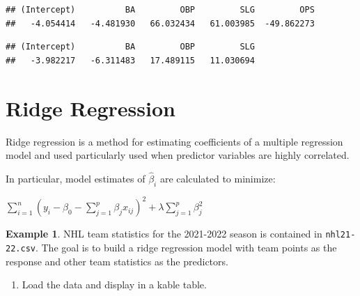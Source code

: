 \documentclass[
  11pt,
]{book}
\newenvironment{Shaded}{\begin{snugshade}}{\end{snugshade}}
\newcommand{\CommentTok}[1]{\textcolor[rgb]{0.56,0.35,0.01}{\textit{#1}}}
\newcommand{\FunctionTok}[1]{\textcolor[rgb]{0.00,0.00,0.00}{#1}}
\newcommand{\NormalTok}[1]{#1}
\newcommand{\SpecialCharTok}[1]{\textcolor[rgb]{0.00,0.00,0.00}{#1}}
\providecommand{\tightlist}{%
  \setlength{\itemsep}{0pt}\setlength{\parskip}{0pt}}
\theoremstyle{definition}
\theoremstyle{definition}
\newtheorem{example}{Example}[chapter]
\theoremstyle{definition}
\theoremstyle{definition}
\theoremstyle{remark}
\begin{document}
\begin{verbatim}
## (Intercept)          BA         OBP         SLG         OPS 
##   -4.054414   -4.481930   66.032434   61.003985  -49.862273
\end{verbatim}

\begin{Shaded}
\end{Shaded}

\begin{verbatim}
## (Intercept)          BA         OBP         SLG 
##   -3.982217   -6.311483   17.489115   11.030694
\end{verbatim}

\newpage

\hypertarget{ridge-regression}{%
\section{Ridge Regression}\label{ridge-regression}}

Ridge regression is a method for estimating coefficients of a multiple regression model and used particularly used when predictor variables are highly correlated.

In particular, model estimates of \(\hat{\beta}_i\) are calculated to minimize:

\(\sum_{i=1}^n (y_i - \beta_0 - \sum_{j=1}^p \beta_j x_{ij})^2 + \lambda \sum_{j=1}^p \beta_j^2\)

\begin{example}
NHL team statistics for the 2021-2022 season is contained in \texttt{nhl21-22.csv}. The goal is to build a ridge regression model with team points as the response and other team statistics as the predictors.
\end{example}

\begin{enumerate}
\def\labelenumi{(\alph{enumi})}
\tightlist
\item
  Load the data and display in a kable table.
\end{enumerate}
\end{document}
